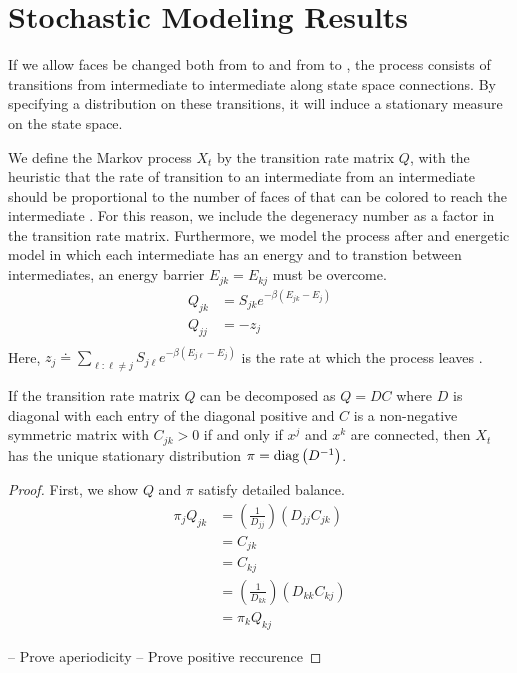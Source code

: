 \section{Stochastic Modeling Results}

If we allow faces be changed both from \spc to \spc and from \spc to , the process consists of transitions from intermediate to intermediate along state space connections. By specifying a distribution on these transitions, it will induce a stationary measure on the state space.  

We define the Markov process $X_t$ by the transition rate matrix $Q$, with the heuristic that the rate of transition to an intermediate \xk from an intermediate \xk should be proportional to the number of faces of \xj that can be colored to reach the intermediate \xk. For this reason, we include the degeneracy number \Sjk\spc as a factor in the transition rate matrix. Furthermore, we model the process after and energetic model in which each intermediate has an energy and to transtion between intermediates, an energy barrier $E_{jk} = E_{kj}$ must be overcome. 
\begin{align}
\label{eq:TransitionRate}
Q_{jk} &= S_{jk}e^{-\beta\left(E_{jk} - E_j\right)} \\
Q_{jj} &= -z_j \\
\end{align}
Here, $z_j \doteq \sum_{\ell: \ell \neq j} S_{j\ell}e^{-\beta\left(E_{j\ell} - E_j\right)}$ is the rate at which the process leaves \xj. 

\begin{mythm}
\label{thm:StatDist}
If the transition rate matrix $Q$ can be decomposed as $Q = DC$ where $D$ is diagonal with each entry of the diagonal positive and $C$ is a non-negative symmetric matrix with $C_{jk} > 0$ if and only if $x^j$ and $x^k$ are connected, then $X_t$ has the unique stationary distribution $\pi = \operatorname{diag}\left(D^{-1}\right)$.         
\end{mythm}
\begin{proof}
First, we show $Q$ and $\pi$ satisfy detailed balance.
\begin{align}
\pi_jQ_{jk} &= \left(\frac{1}{D_{jj}}\right)\left(D_{jj}C_{jk}\right) \\
&= C_{jk} \\
&= C_{kj} \\
&= \left(\frac{1}{D_{kk}}\right)\left(D_{kk}C_{kj}\right) \\
                    &= \pi_kQ_{kj}
\end{align}

-- Prove aperiodicity 
-- Prove positive reccurence

\end{proof}

